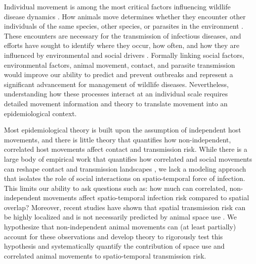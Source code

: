 \documentclass[letterpaper]{article}
\begin{document}
Individual movement is among the most critical factors influencing wildlife disease dynamics \citep{Dougherty2018,Manlove2022}. 
How animals move determines whether they encounter other individuals of the same species, other species, or parasites in the environment \citep{Martinez-Garcia2020,Das2023}. 
These encounters are necessary for the transmission of infectious diseases, and efforts have sought to identify where they occur, how often, and how they are influenced by environmental and social drivers \citep{Titcomb2021,Dougherty2022,Webber2023}. 
Formally linking social factors, environmental factors, animal movement, contact, and parasite transmission would improve our ability to predict and prevent outbreaks and represent a significant advancement for management of wildlife diseases.  
Nevertheless, understanding how these processes interact at an individual scale requires detailed movement information and theory to translate movement into an epidemiological context.

Most epidemiological theory is built upon the assumption of independent host movements, and there is little theory that quantifies how non-independent, correlated host movements affect contact and transmission risk. While there is a large body of empirical work that quantifies how correlated and social movements can reshape contact and transmission landscapes \citep[e.g.,][]{Kjaer2008,Grear2010,Schauber2015a}, we lack a modeling approach that isolates the role of social interactions on spatio-temporal force of infection. This limits our ability to ask questions such as: how much can correlated, non-independent movements affect spatio-temporal infection risk compared to spatial overlap? Moreover, recent studies have shown that spatial transmission risk can be highly localized \citep{Albery2021} and is not necessarily predicted by animal space use \citep{Yang2023a}. We hypothesize that non-independent animal movements can (at least partially) account for these observations and develop theory to rigorously test this hypothesis and systematically quantify the contribution of space use and correlated animal movements to spatio-temporal transmission risk.
\end{document}
